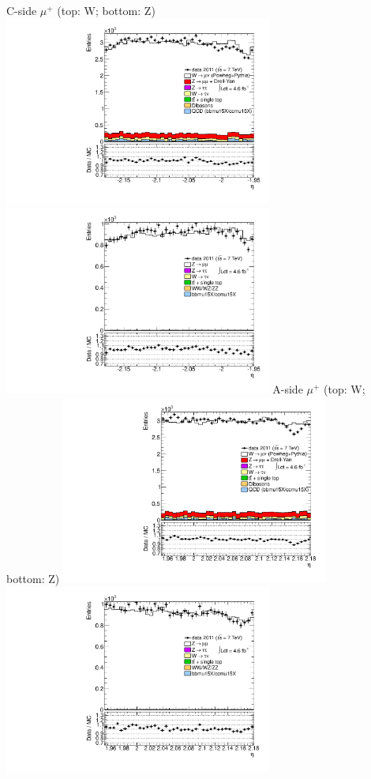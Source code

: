  {
\colb[T]
C-side $\mu^{+}$ (top: W; bottom: Z)
\centering
\includegraphics[width=0.66\textwidth]{dates/20130306/figures/both/WpDtoH_10_C_stack_l_eta_POS} \\
\includegraphics[width=0.66\textwidth]{dates/20130306/figures/both/Z_10_C_stack_lP_eta_ALL.pdf}
A-side $\mu^{+}$ (top: W; bottom: Z)
\centering
\includegraphics[width=0.66\textwidth]{dates/20130306/figures/both/WpDtoH_10_A_stack_l_eta_POS} \\
\includegraphics[width=0.66\textwidth]{dates/20130306/figures/both/Z_10_A_stack_lP_eta_ALL.pdf} 
\cole
}
